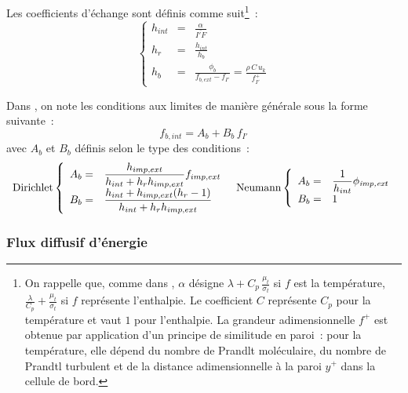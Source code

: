 Les coefficients d'\'echange sont d\'efinis comme suit\footnote{On rappelle que, comme
dans , $\alpha$ d\'esigne $\lambda+C_p\,\frac{\mu_t}{\sigma_t}$
si $f$ est la temp\'erature,
$\frac{\lambda}{C_p}+\frac{\mu_t}{\sigma_t}$ si $f$ repr\'esente l'enthalpie.
Le coefficient $C$ repr\'esente $C_p$ pour la temp\'erature et vaut
$1$ pour l'enthalpie. La grandeur adimensionnelle $f^+$ est obtenue par
application d'un principe de similitude en paroi~: pour la temp\'erature,
elle d\'epend du nombre de
Prandlt mol\'eculaire, du nombre de Prandtl turbulent et de la distance adimensionnelle \`a la paroi $y^+$ dans la cellule de bord.}~:
\begin{equation}
\left\{\begin{array}{lll}
h_{int}&=&\displaystyle\frac{\alpha}{\overline{I'F}}\\
h_r&=&\displaystyle\frac{h_{int}}{h_{b}} \\
h_b&=&\displaystyle\frac{\phi_b}{f_{b,ext}-f_{I'}}=\frac{\rho\,C\,u_k}{f^+_{I'}}
\end{array}\right.
\end{equation}

Dans \CS, on note les conditions aux limites de mani\`ere g\'en\'erale sous
la forme suivante~:
\begin{equation}
f_{b,int}=A_b + B_b\,f_{I'}
\end{equation}
avec $A_b$ et $B_b$ d\'efinis selon le type des conditions~:
\begin{equation}
\begin{array}{c}
\text{Dirichlet}\left\{\begin{array}{ll}
    A_b = &\displaystyle\frac{h_{imp,ext}}{h_{int}+h_r h_{imp,ext} } f_{imp,ext}\\
    B_b = &\displaystyle\frac{h_{int}+h_{imp,ext}(h_r-1)}{h_{int}+h_r h_{imp,ext} }
                  \end{array}\right.
\text{\ \  Neumann}\left\{\begin{array}{ll}
    A_b = &\displaystyle\frac{1}{h_{int}}\phi_{\text{\it imp,ext}}\\
    B_b = &1
                  \end{array}\right.
\end{array}
\end{equation}

\subsubsection*{Flux diffusif d'\'energie}

